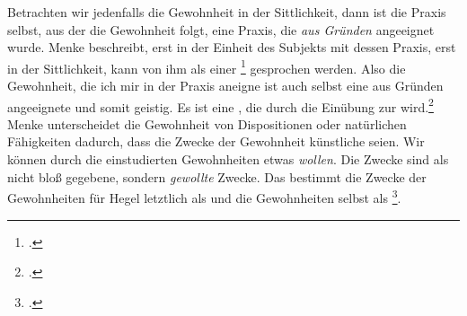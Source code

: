 \documentclass[12pt, a4paper, openany]{report}
\begin{document}
Betrachten wir jedenfalls die Gewohnheit in der Sittlichkeit, dann ist die Praxis selbst, aus der die Gewohnheit folgt, eine Praxis, die \emph{aus Gründen} angeeignet wurde.
Menke beschreibt, erst in der Einheit des Subjekts mit dessen Praxis, erst in der Sittlichkeit, kann von ihm als einer \footcite[][29]{menke_autonomie_2018} gesprochen werden.
Also die Gewohnheit, die ich mir in der Praxis aneigne ist auch selbst eine aus Gründen angeeignete und somit geistig. 
Es ist eine , die durch die Einübung zur  wird.\footcite[][414]{khurana_freiheit_2017}
Menke unterscheidet die Gewohnheit von Dispositionen oder natürlichen Fähigkeiten dadurch, dass die Zwecke der Gewohnheit künstliche seien.
Wir können durch die einstudierten Gewohnheiten etwas \emph{wollen}.
Die Zwecke sind als nicht bloß gegebene, sondern \emph{gewollte} Zwecke. 
Das bestimmt die Zwecke der Gewohnheiten für Hegel letztlich als  und die Gewohnheiten selbst als \footcite[][131]{menke_autonomie_2018}.\\
\end{document}
